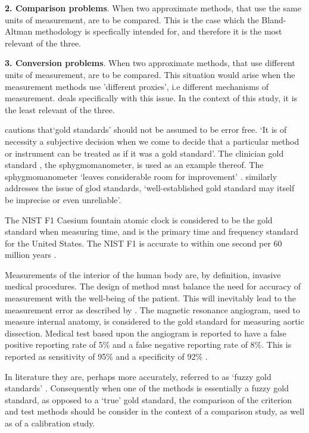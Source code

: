 \documentclass[12pt, a4paper]{report}
\theoremstyle{plain}
\theoremstyle{definition}
\theoremstyle{remark}
\begin{document}
		\bigskip \textbf{2. Comparison problems}. When two approximate
		methods, that use the same units of measurement, are to be
		compared. This is the case which the Bland-Altman methodology is
		specfically intended for, and therefore it is the most relevant of
		the three.
		
		\bigskip \textbf{3. Conversion problems}. When two approximate
		methods, that use different units of measurement, are to be
		compared. This situation would arise when the measurement methods
		use 'different proxies', i.e different mechanisms of measurement.
		\citet{lewis} deals specifically with this issue. In the context
		of this study, it is the least relevant of the three.
		
		\citet[p.47]{DunnSEME} cautions that`gold standards' should not be
		assumed to be error free. `It is of necessity a subjective
		decision when we come to decide that a particular method or
		instrument can be treated as if it was a gold standard'. The
		clinician gold standard , the sphygmomanometer, is used as an
		example thereof.  The sphygmomanometer `leaves considerable room
		for improvement' \citep{DunnSEME}. \citet{pizzi} similarly
		addresses the issue of glod standards, `well-established gold
		standard may itself be imprecise or even unreliable'.
		
		
		The NIST F1 Caesium fountain atomic clock is considered to be the
		gold standard when measuring time, and is the primary time and
		frequency standard for the United States. The NIST F1 is accurate
		to within one second per 60 million years \citep{NIST}.
		
		Measurements of the interior of the human body are, by definition,
		invasive medical procedures. The design of method must balance the
		need for accuracy of measurement with the well-being of the
		patient. This will inevitably lead to the measurement error as
		described by \citet{DunnSEME}. The magnetic resonance angiogram,
		used to measure internal anatomy,  is considered to the gold
		standard for measuring aortic dissection. Medical test based upon
		the angiogram is reported to have a false positive reporting rate
		of 5\% and a false negative reporting rate of 8\%. This is
		reported as sensitivity of 95\% and a specificity of 92\%
		\citep{ACR}.
		
		In literature they are, perhaps more accurately, referred to as
		`fuzzy gold standards' \citep{phelps}. Consequently when one of the methods is
		essentially a fuzzy gold standard, as opposed to a `true' gold
		standard, the comparison of the criterion and test methods should
		be consider in the context of a comparison study, as well as of a
		calibration study.
		
\end{document}
